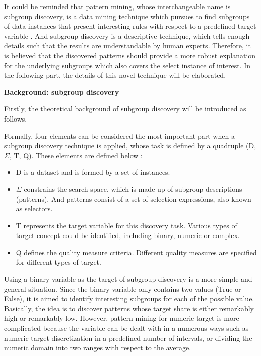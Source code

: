 It could be reminded that pattern mining, whose interchangeable name is subgroup discovery, is a data mining technique which pursues to find subgroups of data instances that present interesting rules with respect to a predefined target variable \cite{herrera2011overview}. And subgroup discovery is a descriptive technique, which tells enough details such that the results are understandable by human experts. Therefore, it is believed that the discovered patterns should provide a more robust explanation for the underlying subgroups which also covers the select instance of interest. In the following part, the details of this novel technique will be elaborated. 

\textbf{Background: subgroup discovery}

Firstly, the theoretical background of subgroup discovery will be introduced as follows. 

Formally, four elements can be considered the most important part when a subgroup discovery technique is applied, whose task is defined by a quadruple (D, $\Sigma$, T, Q). These elements are defined below \cite{atzmueller2004towards} \cite{lemmerich2014novel}: 

\begin{itemize}
	\item D is a dataset and is formed by a set of instances. 
	\item $\Sigma$ constrains the search space, which is made up of subgroup descriptions (patterns). And patterns consist of a set of selection expressions, also known as selectors.
	\item T represents the target variable for this discovery task. Various types of target concept could be identified, including binary, numeric or complex. 
	\item Q defines the quality measure criteria. Different quality measures are specified for different types of target. 
\end{itemize}

Using a binary variable as the target of subgroup discovery is a more simple and general situation. Since the binary variable only contains two values (True or False), it is aimed to identify interesting subgroups for each of the possible value. Basically, the idea is to discover patterns whose target share is either remarkably high or remarkably low. However, pattern mining for numeric target is more complicated because the variable can be dealt with in a numerous ways such as numeric target discretization in a predefined number of intervals, or dividing the numeric domain into two ranges with respect to the average. 

